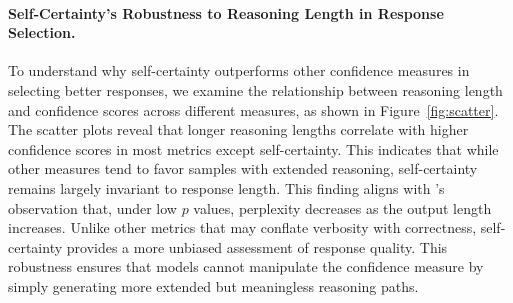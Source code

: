 \paragraph{Self-Certainty's Robustness to Reasoning Length in Response Selection.}
To understand why self-certainty outperforms other confidence measures in selecting better responses, we examine the relationship between reasoning length and confidence scores across different measures, as shown in Figure~\ref{fig:scatter}. The scatter plots reveal that longer reasoning lengths correlate with higher confidence scores in most metrics except self-certainty. This indicates that while other measures tend to favor samples with extended reasoning, self-certainty remains largely invariant to response length. This finding aligns with \citet{basu2020mirostat}'s observation that, under low \(p\) values, perplexity decreases as the output length increases. Unlike other metrics that may conflate verbosity with correctness, self-certainty provides a more unbiased assessment of response quality. This robustness ensures that models cannot manipulate the confidence measure by simply generating more extended but meaningless reasoning paths.

